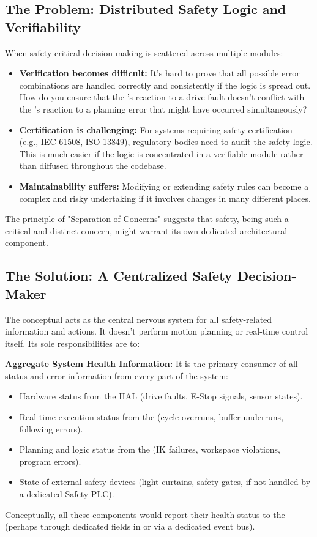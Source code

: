 \subsection{The Problem: Distributed Safety Logic and Verifiability}
\label{subsec:distributed_safety_problem}

When safety-critical decision-making is scattered across multiple modules:
\begin{itemize}
    \item \textbf{Verification becomes difficult:} It's hard to prove that all possible error combinations are handled correctly and consistently if the logic is spread out. How do you ensure that the 's reaction to a drive fault doesn't conflict with the 's reaction to a planning error that might have occurred simultaneously?
    \item \textbf{Certification is challenging:} For systems requiring safety certification (e.g., IEC 61508, ISO 13849), regulatory bodies need to audit the safety logic. This is much easier if the logic is concentrated in a verifiable module rather than diffused throughout the codebase.
    \item \textbf{Maintainability suffers:} Modifying or extending safety rules can become a complex and risky undertaking if it involves changes in many different places.
\end{itemize}
The principle of "Separation of Concerns" suggests that safety, being such a critical and distinct concern, might warrant its own dedicated architectural component.

\subsection{The Solution: A Centralized Safety Decision-Maker}
\label{subsec:safety_supervisor_solution}

The conceptual  acts as the central nervous system for all safety-related information and actions. It doesn't perform motion planning or real-time control itself. Its sole responsibilities are to:


\textbf{Aggregate System Health Information:} It is the primary consumer of all status and error information from every part of the system:
        \begin{itemize}
            \item Hardware status from the HAL (drive faults, E-Stop signals, sensor states).
            \item Real-time execution status from the  (cycle overruns, buffer underruns, following errors).
            \item Planning and logic status from the  (IK failures, workspace violations, program errors).
            \item State of external safety devices (light curtains, safety gates, if not handled by a dedicated Safety PLC).
        \end{itemize}
        Conceptually, all these components would report their health status to the  (perhaps through dedicated fields in  or via a dedicated event bus).

